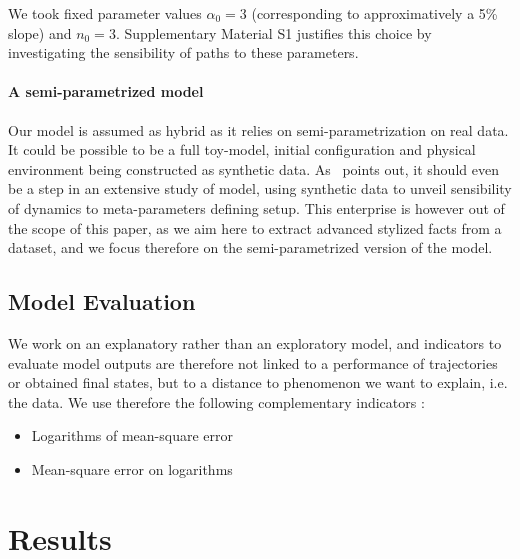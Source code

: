 \documentclass[Royal,sageh,times]{sagej}
\begin{document}
We took fixed parameter values $\alpha_0 = 3$ (corresponding to approximatively a 5\% slope) and $n_0 = 3$. Supplementary Material S1 justifies this choice by investigating the sensibility of paths to these parameters.




\paragraph{A semi-parametrized model}

Our model is assumed as hybrid as it relies on semi-parametrization on real data. It could be possible to be a full toy-model, initial configuration and physical environment being constructed as synthetic data. As~\cite{raimbault2016generation} points out, it should even be a step in an extensive study of model, using synthetic data to unveil sensibility of dynamics to meta-parameters defining setup. This enterprise is however out of the scope of this paper, as we aim here to extract advanced stylized facts from a dataset, and we focus therefore on the semi-parametrized version of the model.



\subsection{Model Evaluation}

We work on an explanatory rather than an exploratory model, and indicators to evaluate model outputs are therefore not linked to a performance of trajectories or obtained final states, but to a distance to phenomenon we want to explain, i.e. the data. We use therefore the following complementary indicators :

\begin{itemize}
\item Logarithms of mean-square error
\item Mean-square error on logarithms
\end{itemize}







\section{Results}
\end{document}
